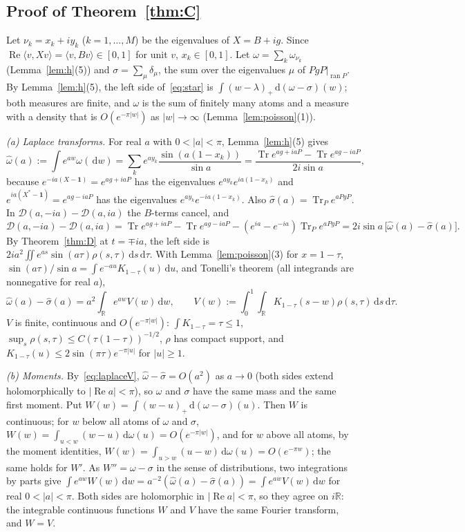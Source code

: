 \documentclass[11pt]{amsart}
\theoremstyle{definition}
\theoremstyle{remark}
\numberwithin{equation}{section}
\newcommand{\R}{\mathbb{R}}
\newcommand{\Tr}{\operatorname{Tr}}
\renewcommand{\Re}{\operatorname{Re}}
\newcommand{\one}{\mathbf{1}}
\newcommand{\ip}[2]{\langle #1,#2\rangle}
\newcommand{\cD}{\mathcal{D}}
\newcommand{\dd}{\,\mathrm{d}}
\begin{document}
\subsection{Proof of Theorem~\ref{thm:C}}\label{subsec:proofC}
Let $\nu_k=x_k+iy_k$ ($k=1,\dots,M$) be the eigenvalues of $X=B+ig$. Since $\Re\ip v{Xv}=\ip v{Bv}\in[0,1]$ for unit $v$,
$x_k\in[0,1]$. Let $\omega=\sum_k\omega_{\nu_k}$ (Lemma~\ref{lem:h}(5)) and $\sigma=\sum_\mu\delta_\mu$, the sum over the
eigenvalues $\mu$ of $PgP|_{\operatorname{ran}P}$. By Lemma~\ref{lem:h}(5), the left side of~\eqref{eq:star} is
$\int(w-\lambda)_+\dd(\omega-\sigma)(w)$; both measures are finite, and $\omega$ is the sum of finitely many atoms and
a measure with a density that is $O(e^{-\pi|w|})$ as $|w|\to\infty$ (Lemma~\ref{lem:poisson}(1)).

\emph{(a) Laplace transforms.} For real $a$ with $0<|a|<\pi$, Lemma~\ref{lem:h}(5) gives
\[
\hat\omega(a):=\int e^{aw}\omega(\dd w)=\sum_ke^{ay_k}\frac{\sin(a(1-x_k))}{\sin a}=\frac{\Tr e^{ag+iaP}-\Tr e^{ag-iaP}}{2i\sin a},
\]
because $e^{-ia(X-\one)}=e^{ag+iaP}$ has the eigenvalues $e^{ay_k}e^{ia(1-x_k)}$ and $e^{ia(X^*-\one)}=e^{ag-iaP}$ has the
eigenvalues $e^{ay_k}e^{-ia(1-x_k)}$. Also $\hat\sigma(a)=\Tr_Pe^{aPgP}$. In $\cD(a,-ia)-\cD(a,ia)$ the $B$-terms cancel,
and
\[
\cD(a,-ia)-\cD(a,ia)=\Tr e^{ag+iaP}-\Tr e^{ag-iaP}-(e^{ia}-e^{-ia})\Tr_Pe^{aPgP}=2i\sin a\,\bigl[\hat\omega(a)-\hat\sigma(a)\bigr].
\]
By Theorem~\ref{thm:D} at $t=\mp ia$, the left side is $2ia^2\iint e^{as}\sin(a\tau)\rho(s,\tau)\dd s\dd\tau$. With
Lemma~\ref{lem:poisson}(3) for $x=1-\tau$, $\sin(a\tau)/\sin a=\int e^{-au}K_{1-\tau}(u)\dd u$, and Tonelli's theorem (all
integrands are nonnegative for real $a$),
\begin{equation}\label{eq:laplaceV}
\hat\omega(a)-\hat\sigma(a)=a^2\int_\R e^{aw}V(w)\dd w,\qquad V(w):=\int_0^1\!\!\int_\R K_{1-\tau}(s-w)\rho(s,\tau)\dd s\dd\tau .
\end{equation}
$V$ is finite, continuous and $O(e^{-\pi|w|})$: $\int K_{1-\tau}=\tau\le1$, $\sup_s\rho(s,\tau)\le C(\tau(1-\tau))^{-1/2}$,
$\rho$ has compact support, and $K_{1-\tau}(u)\le2\sin(\pi\tau)e^{-\pi|u|}$ for $|u|\ge1$.

\emph{(b) Moments.} By~\eqref{eq:laplaceV}, $\hat\omega-\hat\sigma=O(a^2)$ as $a\to0$ (both sides extend holomorphically to
$|\Re a|<\pi$), so $\omega$ and $\sigma$ have the same mass and the same first moment. Put
$W(w)=\int(w-u)_+\dd(\omega-\sigma)(u)$. Then $W$ is continuous; for $w$ below all atoms of $\omega$ and $\sigma$,
$W(w)=\int_{u<w}(w-u)\dd\omega(u)=O(e^{-\pi|w|})$, and for $w$ above all atoms, by the moment identities,
$W(w)=\int_{u>w}(u-w)\dd\omega(u)=O(e^{-\pi w})$; the same holds for $W'$. As $W''=\omega-\sigma$ in the sense of distributions, two integrations by
parts give $\int e^{aw}W(w)\dd w=a^{-2}(\hat\omega(a)-\hat\sigma(a))=\int e^{aw}V(w)\dd w$ for real $0<|a|<\pi$. Both sides are
holomorphic in $|\Re a|<\pi$, so they agree on $i\R$: the integrable continuous functions $W$ and $V$ have the same
Fourier transform, and $W=V$.
\end{document}
